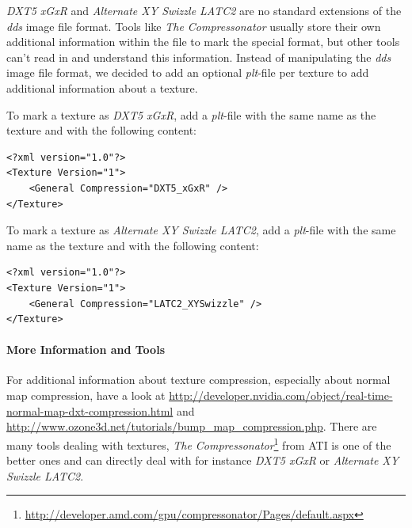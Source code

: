 \emph{DXT5 xGxR} and \emph{Alternate XY Swizzle LATC2} are no standard extensions of the \emph{dds} image file format. Tools like \emph{The Compressonator} usually store their own additional information within the file to mark the special format, but other tools can't read in and understand this information. Instead of manipulating the \emph{dds} image file format, we decided to add an optional \emph{plt}-file per texture to add additional information about a texture.

To mark a texture as \emph{DXT5 xGxR}, add a \emph{plt}-file with the same name as the texture and with the following content:
\begin{lstlisting}[caption=\emph{plt}-file \emph{DXT5 xGxR} normal map compression]
<?xml version="1.0"?>
<Texture Version="1">
	<General Compression="DXT5_xGxR" />
</Texture>
\end{lstlisting}

To mark a texture as \emph{Alternate XY Swizzle LATC2}, add a \emph{plt}-file with the same name as the texture and with the following content:
\begin{lstlisting}[caption=\emph{plt}-file \emph{Alternate XY Swizzle LATC2} normal map compression]
<?xml version="1.0"?>
<Texture Version="1">
	<General Compression="LATC2_XYSwizzle" />
</Texture>
\end{lstlisting}


\paragraph{More Information and Tools}
For additional information about texture compression, especially about normal map compression, have a look at 
\url{http://developer.nvidia.com/object/real-time-normal-map-dxt-compression.html} and \url{http://www.ozone3d.net/tutorials/bump_map_compression.php}.
There are many tools dealing with textures, \emph{The Compressonator}\footnote{\url{http://developer.amd.com/gpu/compressonator/Pages/default.aspx}} from ATI is one of the better ones and can directly deal with for instance \emph{DXT5 xGxR} or \emph{Alternate XY Swizzle LATC2}.
